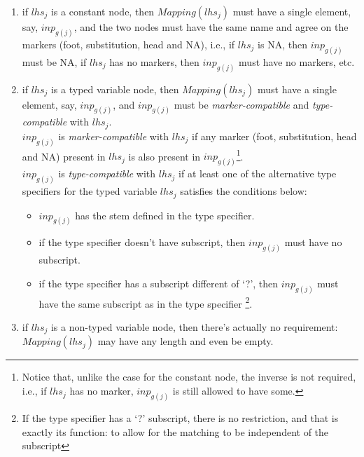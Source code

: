\begin{enumerate}

\item if $lhs_j$ is a constant node, then $Mapping(lhs_j)$ must have a 
        single element, say, $inp_{g(j)}$, and the two nodes must have the same
        name and agree on the markers (foot, substitution, head and NA), i.e.,
        if $lhs_j$ is NA, then $inp_{g(j)}$ must be NA, 
        if $lhs_j$ has no markers, then $inp_{g(j)}$ must have no markers, etc.

\item if $lhs_j$ is a typed variable node, then $Mapping(lhs_j)$ must have a 
        single element, say, $inp_{g(j)}$, and $inp_{g(j)}$ must be 
        {\it marker-compatible} and 
        {\it type-compatible} with $lhs_j$. \\
        $inp_{g(j)}$ is 
        {\it marker-compatible} with $lhs_j$ if any marker
         (foot, substitution, head and NA) present in $lhs_j$ is also
        present in $inp_{g(j)}$\footnote{Notice that, unlike the case for the
        constant node, the inverse is not required, 
        i.e., if $lhs_j$ has no marker, $inp_{g(j)}$ is still 
        allowed to have some.}.\\
        $inp_{g(j)}$ is {\it type-compatible} with $lhs_j$ 
        if at least one of the alternative 
        type specifiers for the typed variable $lhs_j$ satisfies 
        the conditions below:

\begin{itemize}
\item   $inp_{g(j)}$ has the stem defined in the type specifier.
\item   if the type specifier doesn't have subscript, then 
        $inp_{g(j)}$ must have no subscript.
\item   if the type specifier has a subscript different of `?', then 
        $inp_{g(j)}$ must have the same subscript as in the type specifier
        \footnote{If the type specifier has a `?' subscript, there is no
        restriction, and that is exactly its function: to allow for the 
        matching to be independent of the subscript}.
\end{itemize}

\item if $lhs_j$ is a non-typed variable node, then there's actually no
        requirement: $Mapping(lhs_j)$ may have any length and even be 
        empty.
\end{enumerate}
        
